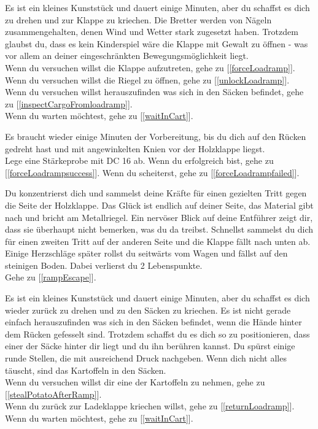 
Es ist ein kleines Kunststück und dauert einige Minuten, aber du schaffst es dich zu drehen und zur Klappe zu kriechen. Die Bretter werden von Nägeln zusammengehalten, denen Wind und Wetter stark zugesetzt haben. Trotzdem glaubst du, dass es kein Kinderspiel wäre die Klappe mit Gewalt zu öffnen - was vor allem an deiner eingeschränkten Bewegungsmöglichkeit liegt.
\\Wenn du versuchen willst die Klappe aufzutreten, gehe zu [\ref{forceLoadramp}].
\\Wenn du versuchen willst die Riegel zu öffnen, gehe zu [\ref{unlockLoadramp}].
\\Wenn du versuchen willst herauszufinden was sich in den Säcken befindet, gehe zu [\ref{inspectCargoFromloadramp}].
\\Wenn du warten möchtest, gehe zu [\ref{waitInCart}].


Es braucht wieder einige Minuten der Vorbereitung, bis du dich auf den Rücken gedreht hast und mit angewinkelten Knien vor der Holzklappe liegst.\\
Lege eine Stärkeprobe mit DC 16 ab. Wenn du erfolgreich bist, gehe zu [\ref{forceLoadrampsuccess}].
Wenn du scheiterst, gehe zu [\ref{forceLoadrampfailed}].


Du konzentrierst dich und sammelst deine Kräfte für einen gezielten Tritt gegen die Seite der Holzklappe. Das Glück ist endlich auf deiner Seite, das Material gibt nach und bricht am Metallriegel. Ein nervöser Blick auf deine Entführer zeigt dir, dass sie überhaupt nicht bemerken, was du da treibst. Schnellst sammelst du dich für einen zweiten Tritt auf der anderen Seite und die Klappe fällt nach unten ab. Einige Herzschläge später rollst du seitwärts vom Wagen und fällst auf den steinigen Boden. Dabei verlierst du 2 Lebenspunkte.
\\Gehe zu [\ref{rampEscape}].


Es ist ein kleines Kunststück und dauert einige Minuten, aber du schaffst es dich wieder zurück zu drehen und zu den Säcken zu kriechen. Es ist nicht gerade einfach herauszufinden was sich in den Säcken befindet, wenn die Hände hinter dem Rücken gefesselt sind. Trotzdem schaffst du es dich so zu positionieren, dass einer der Säcke hinter dir liegt und du ihn berühren kannst. Du spürst einige runde Stellen, die mit ausreichend Druck nachgeben. Wenn dich nicht alles täuscht, sind das Kartoffeln in den Säcken.
\\Wenn du versuchen willst dir eine der Kartoffeln zu nehmen, gehe zu [\ref{stealPotatoAfterRamp}].
\\Wenn du zurück zur Ladeklappe kriechen willst, gehe zu [\ref{returnLoadramp}].
\\Wenn du warten möchtest, gehe zu [\ref{waitInCart}].

